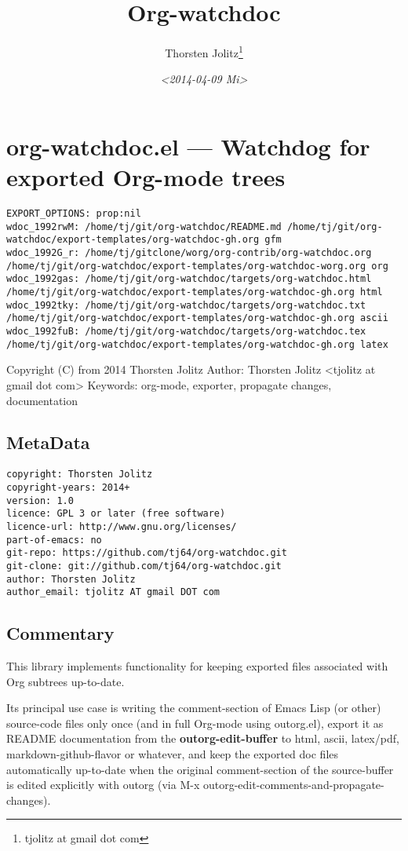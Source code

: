 \documentclass[11pt]{article}
\author{Thorsten Jolitz\thanks{tjolitz at gmail dot com}}
\date{\textit{<2014-04-09 Mi>}}
\title{Org-watchdoc}
\begin{document}
\maketitle
\setcounter{tocdepth}{3}
\tableofcontents


\section{org-watchdoc.el --- Watchdog for exported Org-mode trees}
\label{sec-1}
\begin{verbatim}
EXPORT_OPTIONS: prop:nil
wdoc_1992rwM: /home/tj/git/org-watchdoc/README.md /home/tj/git/org-watchdoc/export-templates/org-watchdoc-gh.org gfm
wdoc_1992G_r: /home/tj/gitclone/worg/org-contrib/org-watchdoc.org /home/tj/git/org-watchdoc/export-templates/org-watchdoc-worg.org org
wdoc_1992gas: /home/tj/git/org-watchdoc/targets/org-watchdoc.html /home/tj/git/org-watchdoc/export-templates/org-watchdoc-gh.org html
wdoc_1992tky: /home/tj/git/org-watchdoc/targets/org-watchdoc.txt /home/tj/git/org-watchdoc/export-templates/org-watchdoc-gh.org ascii
wdoc_1992fuB: /home/tj/git/org-watchdoc/targets/org-watchdoc.tex /home/tj/git/org-watchdoc/export-templates/org-watchdoc-gh.org latex
\end{verbatim}

Copyright (C) from 2014 Thorsten Jolitz
Author: Thorsten Jolitz <tjolitz at gmail dot com>
Keywords: org-mode, exporter, propagate changes, documentation

\subsection{MetaData}
\label{sec-1-1}
\begin{verbatim}
copyright: Thorsten Jolitz
copyright-years: 2014+
version: 1.0
licence: GPL 3 or later (free software)
licence-url: http://www.gnu.org/licenses/
part-of-emacs: no
git-repo: https://github.com/tj64/org-watchdoc.git
git-clone: git://github.com/tj64/org-watchdoc.git
author: Thorsten Jolitz
author_email: tjolitz AT gmail DOT com
\end{verbatim}
\subsection{Commentary}
\label{sec-1-2}

This library implements functionality for keeping exported files
associated with Org subtrees up-to-date.

Its principal use case is writing the comment-section of Emacs
Lisp (or other) source-code files only once (and in full Org-mode
using outorg.el), export it as README documentation from the
\textbf{outorg-edit-buffer} to html, ascii, latex/pdf,
markdown-github-flavor or whatever, and keep the exported doc
files automatically up-to-date when the original comment-section
of the source-buffer is edited explicitly with outorg (via M-x
outorg-edit-comments-and-propagate-changes).
\end{document}
